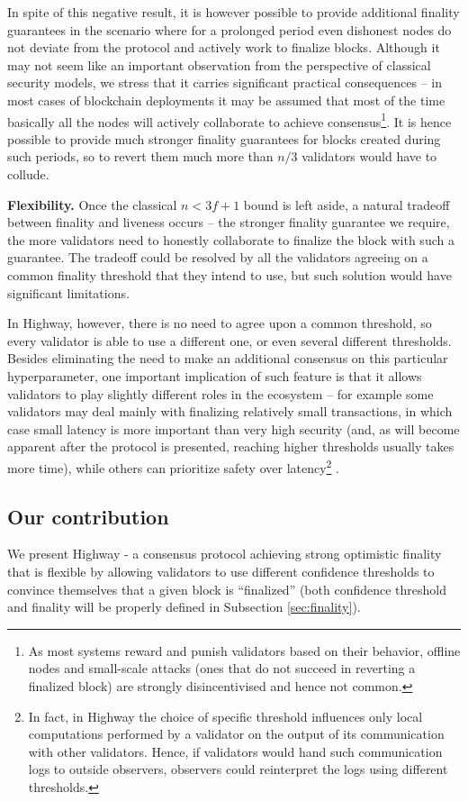\documentclass[12pt, fleqn]{article}
\begin{document}
In spite of this negative result, it is however possible to provide additional finality guarantees in the scenario where for a prolonged period even dishonest nodes do not deviate from the protocol and actively work to finalize blocks.
Although it may not seem like an important observation from the perspective of classical security models, we stress that it carries significant practical consequences -- in most cases of blockchain deployments it may be assumed that most of the time basically all the nodes will actively collaborate to achieve consensus\footnote{As most systems reward and punish validators based on their behavior, offline nodes and small-scale attacks (ones that do not succeed in reverting a finalized block) are strongly disincentivised and hence not common.}.
It is hence possible to provide much stronger finality guarantees for blocks created during such periods, so to revert them much more than $n/3$ validators would have to collude.


{\bf Flexibility.}
Once the classical $n<3f+1$ bound is left aside, a natural tradeoff between finality and liveness occurs -- the stronger finality guarantee we require, the more validators need to honestly collaborate to finalize the block with such a guarantee.
The tradeoff could be resolved by all the validators agreeing on a common finality threshold that they intend to use, but such solution would have significant limitations.

In Highway, however, there is no need to agree upon a common threshold, so every validator is able to use a different one, or even several different thresholds.
Besides eliminating the need to make an additional consensus on this particular hyperparameter, one important implication of such feature is that it allows validators to play slightly different roles in the ecosystem -- for example some validators may deal mainly with finalizing relatively small transactions, in which case small latency is more important than very high security (and, as will become apparent after the protocol is presented, reaching higher thresholds usually takes more time), while others can prioritize safety over latency\footnote{In fact, in Highway the choice of specific threshold influences only local computations performed by a validator on the output of its communication with other validators. Hence, if validators would hand such communication logs to outside observers, observers could reinterpret the logs using different thresholds.} .


\subsection{Our contribution}
We present Highway - a consensus protocol achieving strong optimistic finality that is flexible by allowing validators to use different confidence thresholds to convince themselves that a given block is ``finalized'' (both confidence threshold and finality will be properly defined in Subsection \ref{sec:finality}). 
\end{document}
